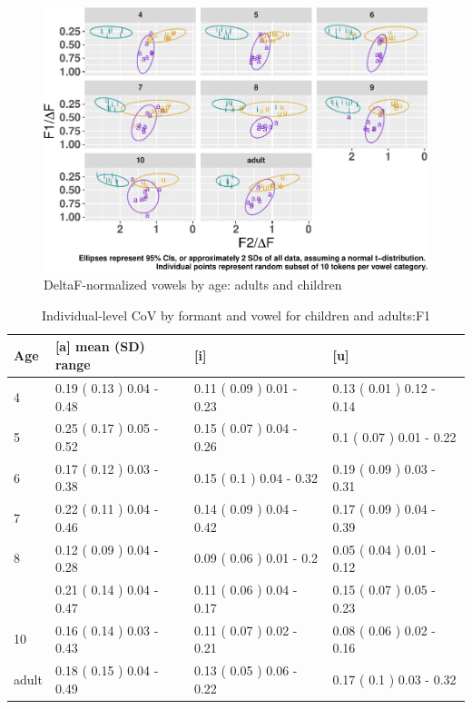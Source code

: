 \documentclass[
]{article}
\begin{document}
\begin{figure}
\centering
\includegraphics{3_vtl_results_files/figure-latex/plot-raw-deltaf-data-1.pdf}
\caption{\label{fig:plot-raw-deltaf-data}DeltaF-normalized vowels by age: adults and children}
\end{figure}

\begin{table}[!h]

\caption{\label{tab:delta-disp-tbl-spkr}Individual-level CoV by formant and vowel for children and adults:F1}
\centering
\begin{tabular}[t]{llll}
\toprule
Age & [a] mean (SD) range & [i] & [u]\\
\midrule
4 & 0.19 ( 0.13 ) 0.04 - 0.48 & 0.11 ( 0.09 ) 0.01 - 0.23 & 0.13 ( 0.01 ) 0.12 - 0.14\\
5 & 0.25 ( 0.17 ) 0.05 - 0.52 & 0.15 ( 0.07 ) 0.04 - 0.26 & 0.1 ( 0.07 ) 0.01 - 0.22\\
6 & 0.17 ( 0.12 ) 0.03 - 0.38 & 0.15 ( 0.1 ) 0.04 - 0.32 & 0.19 ( 0.09 ) 0.03 - 0.31\\
7 & 0.22 ( 0.11 ) 0.04 - 0.46 & 0.14 ( 0.09 ) 0.04 - 0.42 & 0.17 ( 0.09 ) 0.04 - 0.39\\
8 & 0.12 ( 0.09 ) 0.04 - 0.28 & 0.09 ( 0.06 ) 0.01 - 0.2 & 0.05 ( 0.04 ) 0.01 - 0.12\\
\addlinespace
9 & 0.21 ( 0.14 ) 0.04 - 0.47 & 0.11 ( 0.06 ) 0.04 - 0.17 & 0.15 ( 0.07 ) 0.05 - 0.23\\
10 & 0.16 ( 0.14 ) 0.03 - 0.43 & 0.11 ( 0.07 ) 0.02 - 0.21 & 0.08 ( 0.06 ) 0.02 - 0.16\\
adult & 0.18 ( 0.15 ) 0.04 - 0.49 & 0.13 ( 0.05 ) 0.06 - 0.22 & 0.17 ( 0.1 ) 0.03 - 0.32\\
\bottomrule
\end{tabular}
\end{table}
\end{document}
